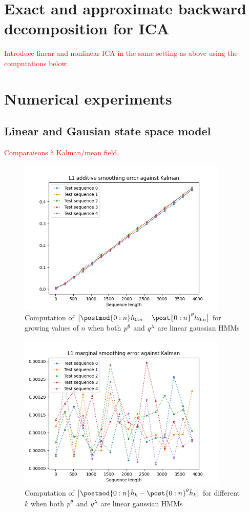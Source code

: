 \documentclass{article}
\begin{document}
\section{Exact and approximate backward decomposition for ICA}
\textcolor{red}{Introduce linear and nonlinear ICA in the same setting as above using the computations below.}

\section{Numerical experiments}
\subsection{Linear and Gausian state space model}
\textcolor{red}{Comparaisons \`a Kalman/mean field.}

\begin{figure}[h]
    \centering
    \includegraphics[width=10cm]{additive_smoothing_errors.png}
    \caption{Computation of $\big| \postmod{0:n} h_{0:n} -  \post{0:n}^{\parvec} h_{0:n} \big|$ for growing values of $n$ when both $p^\theta$ and $q^{\lambda}$ are linear gaussian HMMs}
\end{figure}

\begin{figure}[h]
    \centering
    \includegraphics[width=10cm]{marginal_smoothing_errors.png}
    \caption{Computation of $\big| \postmod{0:n} \tilde{h}_{k} -  \post{0:n}^{\parvec} \tilde{h}_{k} \big|$ for different $k$ when both $p^\theta$ and $q^{\lambda}$ are linear gaussian HMMs}
\end{figure}
\end{document}
